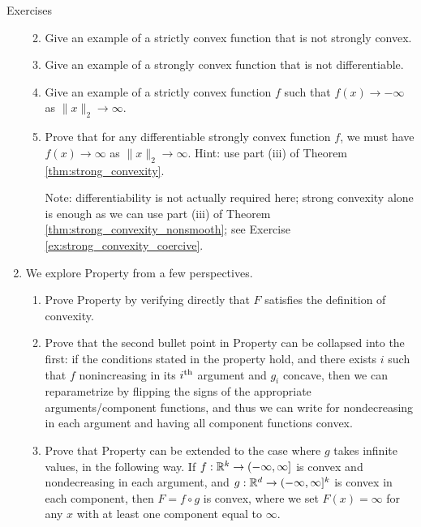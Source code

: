 \begin{xcb}{Exercises}
\begin{enumerate}[label=\thechapter.\arabic*]
\begin{enumerate}[label=\alph*.]
\item Give an example of a strictly convex function that is not strongly
  convex. 
  
\item Give an example of a strongly convex function that is not differentiable. 

\item Give an example of a strictly convex function $f$ such that $f(x) \to
  -\infty$ as $\|x\|_2 \to \infty$. 

\item Prove that for any differentiable strongly convex function $f$, we must
  have $f(x) \to \infty$ as $\|x\|_2 \to \infty$. Hint: use part (iii) of Theorem
  \ref{thm:strong_convexity}.
  
  \smallskip
  Note: differentiability is not actually required here; strong convexity alone
  is enough as we can use part (iii) of Theorem
  \ref{thm:strong_convexity_nonsmooth}; see Exercise
  \ref{ex:strong_convexity_coercive}.  
\end{enumerate}

\item \label{ex:function_composition} 
  We explore Property  from a few perspectives.   

\begin{enumerate}[label=\alph*.]
\item Prove Property  by verifying directly
  that $F$ satisfies the definition of convexity. 

\item Prove that the second bullet point in Property
   can be collapsed into the first: if the
  conditions stated in the property hold, and there exists $i$ such that $f$ 
  nonincreasing in its $i^{\textnormal{th}}$ argument and $g_i$ concave, then we can
  reparametrize by flipping the signs of the appropriate arguments/component 
  functions, and thus we can write  for  
   nondecreasing in each argument and  
  having all component functions convex. 

\item Prove that Property  can be extended to
  the case where $g$ takes infinite values, in the following way. If $f : \mathbb{R}^k
  \to (-\infty, \infty]$ is convex and nondecreasing in each argument, and $g :
  \mathbb{R}^d \to (-\infty, \infty]^k$ is convex in each component, then $F = f \circ
  g$ is convex, where we set $F(x) = \infty$ for any $x$ with at least one
  component equal to $\infty$.  
\end{enumerate}


\end{enumerate}
\end{xcb}
